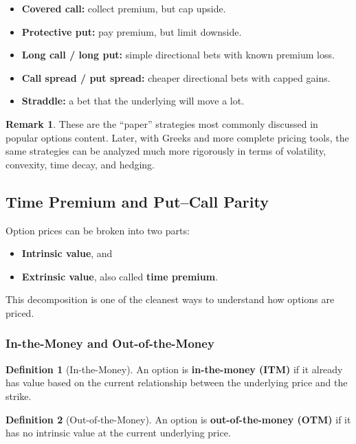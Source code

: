 \documentclass[11pt]{article}
\theoremstyle{definition}
\newtheorem{definition}{Definition}[section]
\newtheorem{remark}{Remark}[section]
\begin{document}
\begin{itemize}[leftmargin=2em]
    \item \textbf{Covered call:} collect premium, but cap upside.
    \item \textbf{Protective put:} pay premium, but limit downside.
    \item \textbf{Long call / long put:} simple directional bets with known premium loss.
    \item \textbf{Call spread / put spread:} cheaper directional bets with capped gains.
    \item \textbf{Straddle:} a bet that the underlying will move a lot.
\end{itemize}

\begin{remark}
These are the ``paper'' strategies most commonly discussed in popular options content. Later, with Greeks and more complete pricing tools, the same strategies can be analyzed much more rigorously in terms of volatility, convexity, time decay, and hedging.
\end{remark}

\subsection{Time Premium and Put--Call Parity}

Option prices can be broken into two parts:
\begin{itemize}[leftmargin=2em]
    \item \textbf{Intrinsic value}, and
    \item \textbf{Extrinsic value}, also called \textbf{time premium}.
\end{itemize}

This decomposition is one of the cleanest ways to understand how options are priced.

\subsubsection{In-the-Money and Out-of-the-Money}

\begin{definition}[In-the-Money]
An option is \textbf{in-the-money (ITM)} if it already has value based on the current relationship between the underlying price and the strike.
\end{definition}

\begin{definition}[Out-of-the-Money]
An option is \textbf{out-of-the-money (OTM)} if it has no intrinsic value at the current underlying price.
\end{definition}
\end{document}
